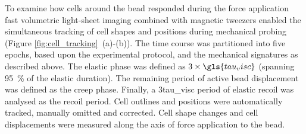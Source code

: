 To examine how cells around the bead responded during the force application fast volumetric light-sheet imaging combined with magnetic tweezers enabled the simultaneous tracking of cell shapes and positions during mechanical probing (Figure \ref{fig:cell_tracking}~(a)-(b)).
The time course was partitioned into five epochs, based upon the experimental protocol, and the mechanical signatures as described above.
The elastic phase was defined as \(3\times\gls{tau_visc}\) (spanning \SI{95}{\percent} of the elastic duration).
The remaining period of active bead displacement was defined as the creep phase.
Finally, a 3\gls{tau_visc} period of elastic recoil was analysed as the recoil period.
Cell outlines and positions were automatically tracked, manually omitted and corrected.
Cell shape changes and cell displacements were measured along the axis of force application to the bead.


